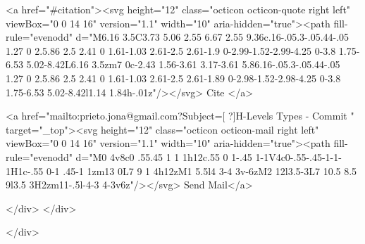      <a  href="#citation"><svg height="12" class="octicon octicon-quote right left" viewBox="0 0 14 16" version="1.1" width="10" aria-hidden="true"><path fill-rule="evenodd" d="M6.16 3.5C3.73 5.06 2.55 6.67 2.55 9.36c.16-.05.3-.05.44-.05 1.27 0 2.5.86 2.5 2.41 0 1.61-1.03 2.61-2.5 2.61-1.9 0-2.99-1.52-2.99-4.25 0-3.8 1.75-6.53 5.02-8.42L6.16 3.5zm7 0c-2.43 1.56-3.61 3.17-3.61 5.86.16-.05.3-.05.44-.05 1.27 0 2.5.86 2.5 2.41 0 1.61-1.03 2.61-2.5 2.61-1.89 0-2.98-1.52-2.98-4.25 0-3.8 1.75-6.53 5.02-8.42l1.14 1.84h-.01z"/></svg> Cite
      </a>

      <a href="mailto:prieto.jona@gmail.com?Subject=[ ?]H-Levels Types - Commit " target="_top"><svg height="12" class="octicon octicon-mail right left" viewBox="0 0 14 16" version="1.1" width="10" aria-hidden="true"><path fill-rule="evenodd" d="M0 4v8c0 .55.45 1 1 1h12c.55 0 1-.45 1-1V4c0-.55-.45-1-1-1H1c-.55 0-1 .45-1 1zm13 0L7 9 1 4h12zM1 5.5l4 3-4 3v-6zM2 12l3.5-3L7 10.5 8.5 9l3.5 3H2zm11-.5l-4-3 4-3v6z"/></svg> Send Mail</a>

    </div>
  </div>

</div>




